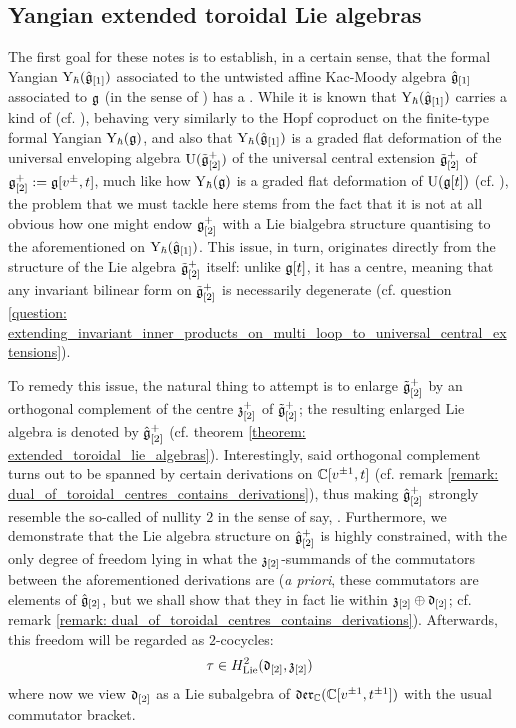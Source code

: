         \subsection{Yangian extended toroidal Lie algebras}
            The first goal for these notes is to establish, in a certain sense, that the formal Yangian $\mathrm{Y}_{\hbar}(\hat{\mathfrak{g}}_{[1]})$ associated to the untwisted affine Kac-Moody algebra $\hat{\mathfrak{g}}_{[1]}$ associated to $\mathfrak{g}$ (in the sense of \cite[Chapter 7]{kac_infinite_dimensional_lie_algebras}) has a . While it is known that $\mathrm{Y}_{\hbar}(\hat{\mathfrak{g}}_{[1]})$ carries a kind of  (cf. \cite{guay_nakajima_wendlandt_affine_yangian_coproduct}), behaving very similarly to the Hopf coproduct on the finite-type formal Yangian $\mathrm{Y}_{\hbar}(\mathfrak{g})$, and also that $\mathrm{Y}_{\hbar}(\hat{\mathfrak{g}}_{[1]})$ is a graded flat deformation of the universal enveloping algebra $\mathrm{U}(\tilde{\mathfrak{g}}_{[2]}^+)$ of the universal central extension $\tilde{\mathfrak{g}}_{[2]}^+$ of $\mathfrak{g}_{[2]}^+ := \mathfrak{g}[v^{\pm}, t]$, much like how $\mathrm{Y}_{\hbar}(\mathfrak{g})$ is a graded flat deformation of $\mathrm{U}(\mathfrak{g}[t])$ (cf. \cite{chari_pressley_quantum_groups}), the problem that we must tackle here stems from the fact that it is not at all obvious how one might endow $\mathfrak{g}_{[2]}^+$ with a Lie bialgebra structure quantising to the aforementioned  on $\mathrm{Y}_{\hbar}(\hat{\mathfrak{g}}_{[1]})$. This issue, in turn, originates directly from the structure of the Lie algebra $\tilde{\mathfrak{g}}_{[2]}^+$ itself: unlike $\mathfrak{g}[t]$, it has a centre, meaning that any invariant bilinear form on $\tilde{\mathfrak{g}}_{[2]}^+$ is necessarily degenerate (cf. question \ref{question: extending_invariant_inner_products_on_multi_loop_to_universal_central_extensions}).

            To remedy this issue, the natural thing to attempt is to enlarge $\tilde{\mathfrak{g}}_{[2]}^+$ by an orthogonal complement of the centre $\mathfrak{z}_{[2]}^+$ of $\tilde{\mathfrak{g}}_{[2]}^+$; the resulting enlarged Lie algebra is denoted by $\hat{\mathfrak{g}}_{[2]}^+$ (cf. theorem \ref{theorem: extended_toroidal_lie_algebras}). Interestingly, said orthogonal complement turns out to be spanned by certain derivations on $\mathbb{C}[v^{\pm 1}, t]$ (cf. remark \ref{remark: dual_of_toroidal_centres_contains_derivations}), thus making $\hat{\mathfrak{g}}_{[2]}^+$ strongly resemble the so-called  of nullity $2$ in the sense of say, \cite{neher_lectures_on_EALAs}. Furthermore, we demonstrate that the Lie algebra structure on $\hat{\mathfrak{g}}_{[2]}^+$ is highly constrained, with the only degree of freedom lying in what the $\mathfrak{z}_{[2]}$-summands of the commutators between the aforementioned derivations are (\textit{a priori}, these commutators are elements of $\hat{\mathfrak{g}}_{[2]}$, but we shall show that they in fact lie within $\mathfrak{z}_{[2]} \oplus \mathfrak{d}_{[2]}$; cf. remark \ref{remark: dual_of_toroidal_centres_contains_derivations}). Afterwards, this freedom will be regarded as $2$-cocycles:
                $$\tau \in H^2_{\mathrm{Lie}}(\mathfrak{d}_{[2]}, \mathfrak{z}_{[2]})$$
            where now we view $\mathfrak{d}_{[2]}$ as a Lie subalgebra of $\mathfrak{der}_{\mathbb{C}}(\mathbb{C}[v^{\pm 1}, t^{\pm 1}])$ with the usual commutator bracket. 

